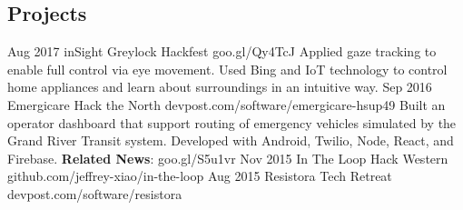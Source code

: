\documentclass{resume}
\begin{document}
\begin{main}
    \section{Projects}
      \begin{entrylist}
        \rightentry%
          {Aug 2017}%
          {inSight}%
          {Greylock Hackfest}%
          {goo.gl/Qy4TcJ}%
          {%
          {%
            Applied gaze tracking to enable full control via eye movement. %
          }%
          {%
            Used Bing and IoT technology to control home appliances and learn about surroundings %
            in an intuitive way. %
          }}
        \rightentry%
          {Sep 2016}%
          {Emergicare}%
          {Hack the North}%
          {devpost.com/software/emergicare-hsup49}%
          {%
          {%
            Built an operator  dashboard that support routing of emergency vehicles simulated by %
            the Grand River Transit system. %
          }%
          {%
            Developed with Android, Twilio, Node, React, and Firebase. %
          }%
          {%
            \textbf{Related News}: \color{lightred}goo.gl/S5u1vr%
          }}
        \rightentry%
          {Nov 2015}%
          {In The Loop}%
          {Hack Western}%
          {github.com/jeffrey-xiao/in-the-loop}%
          {}
        \rightentry%
          {Aug 2015}%
          {Resistora}%
          {Tech Retreat}%
          {devpost.com/software/resistora}%
          {}
      \end{entrylist}
  \end{main}
\end{document}
